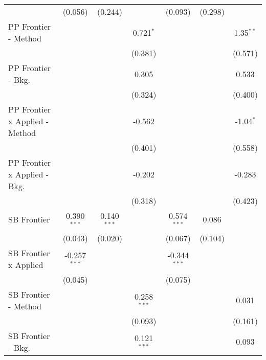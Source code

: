 \begin{tabular}{lcccccc}
                                  & (0.056)        & (0.244)       &                & (0.093)        & (0.298)       &   \\   
   PP Frontier - Method           &                &               & 0.721$^{*}$    &                &               & 1.35$^{**}$\\   
                                  &                &               & (0.381)        &                &               & (0.571)\\   
   PP Frontier - Bkg.             &                &               & 0.305          &                &               & 0.533\\   
                                  &                &               & (0.324)        &                &               & (0.400)\\   
   PP Frontier x Applied - Method &                &               & -0.562         &                &               & -1.04$^{*}$\\   
                                  &                &               & (0.401)        &                &               & (0.558)\\   
   PP Frontier x Applied - Bkg.   &                &               & -0.202         &                &               & -0.283\\   
                                  &                &               & (0.318)        &                &               & (0.423)\\   
   SB Frontier                    & 0.390$^{***}$  & 0.140$^{***}$ &                & 0.574$^{***}$  & 0.086         &   \\   
                                  & (0.043)        & (0.020)       &                & (0.067)        & (0.104)       &   \\   
   SB Frontier x Applied          & -0.257$^{***}$ &               &                & -0.344$^{***}$ &               &   \\   
                                  & (0.045)        &               &                & (0.075)        &               &   \\   
   SB Frontier - Method           &                &               & 0.258$^{***}$  &                &               & 0.031\\   
                                  &                &               & (0.093)        &                &               & (0.161)\\   
   SB Frontier - Bkg.             &                &               & 0.121$^{***}$  &                &               & 0.093\\   

\end{tabular}
